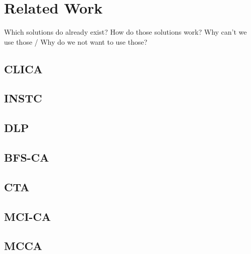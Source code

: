 \chapter{Related Work}
Which solutions do already exist?\newline
How do those solutions work?\newline
Why can't we use those / Why do we not want to use those?\newline
\cite{overview_caa}
\section{CLICA}
\section{INSTC}
\section{DLP}
\section{BFS-CA}
\section{CTA}
\section{MCI-CA}
\section{MCCA}
